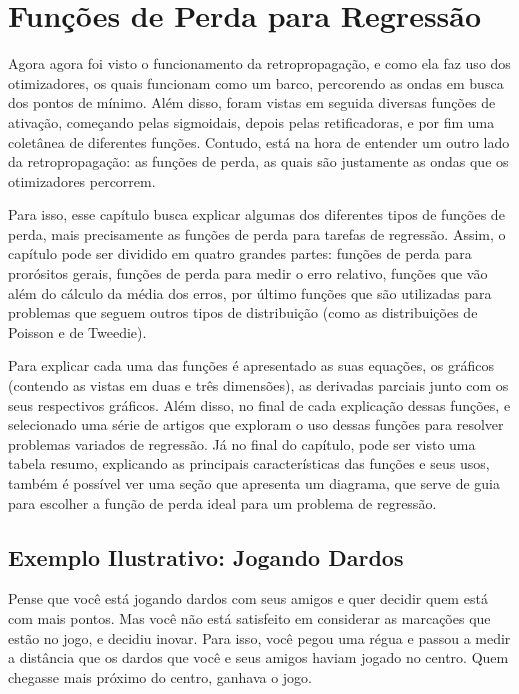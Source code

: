 
\chapter{Funções de Perda para Regressão}
\label{cap:perda-regressao}

Agora agora foi visto o funcionamento da retropropagação, e como ela faz uso dos otimizadores, os quais funcionam como um barco, percorendo as ondas em busca dos pontos de mínimo. Além disso, foram vistas em seguida diversas funções de ativação, começando pelas sigmoidais, depois pelas retificadoras, e por fim uma coletânea de diferentes funções. Contudo, está na hora de entender um outro lado da retropropagação: as funções de perda, as quais são justamente as ondas que os otimizadores percorrem.

Para isso, esse capítulo busca explicar algumas dos diferentes tipos de funções de perda, mais precisamente as funções de perda para tarefas de regressão. Assim, o capítulo pode ser dividido em quatro grandes partes: funções de perda para prorósitos gerais, funções de perda para medir o erro relativo, funções que vão além do cálculo da média dos erros, por último funções que são utilizadas para problemas que seguem outros tipos de distribuição (como as distribuições de Poisson e de Tweedie).

Para explicar cada uma das funções é apresentado as suas equações, os gráficos (contendo as vistas em duas e três dimensões), as derivadas parciais junto com os seus respectivos gráficos. Além disso, no final de cada explicação dessas funções, e selecionado uma série de artigos que exploram o uso dessas funções para resolver problemas variados de regressão. Já no final do capítulo, pode ser visto uma tabela resumo, explicando as principais características das funções e seus usos, também é possível ver uma seção que apresenta um diagrama, que serve de guia para escolher a função de perda ideal para um problema de regressão.

\section{Exemplo Ilustrativo: Jogando Dardos}

Pense que você está jogando dardos com seus amigos e quer decidir quem está com mais pontos. Mas você não está satisfeito em considerar as marcações que estão no jogo, e decidiu inovar. Para isso, você pegou uma régua e passou a medir a distância que os dardos que você e seus amigos haviam jogado no centro. Quem chegasse mais próximo do centro, ganhava o jogo.

